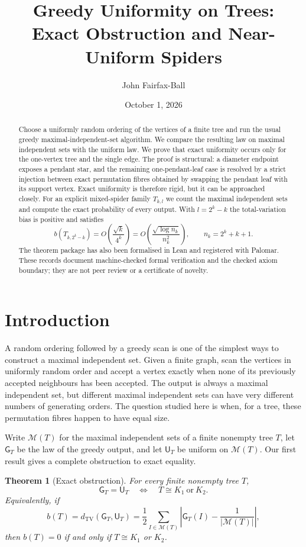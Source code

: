 \documentclass[11pt]{article}
\title{Greedy Uniformity on Trees:\\Exact Obstruction and Near-Uniform Spiders}
\author{John Fairfax-Ball}
\date{October 1, 2026}
\newtheorem{theorem}{Theorem}[section]
\theoremstyle{definition}
\newcommand{\M}{\mathcal{M}}
\newcommand{\GG}{\mathsf{G}}
\newcommand{\UU}{\mathsf{U}}
\newcommand{\TV}{\mathrm{TV}}
\begin{document}
\maketitle

\begin{abstract}
Choose a uniformly random ordering of the vertices of a finite tree and run the usual greedy maximal-independent-set algorithm.  We compare the resulting law on maximal independent sets with the uniform law.  We prove that exact uniformity occurs only for the one-vertex tree and the single edge.  The proof is structural: a diameter endpoint exposes a pendant star, and the remaining one-pendant-leaf case is resolved by a strict injection between exact permutation fibres obtained by swapping the pendant leaf with its support vertex.  Exact uniformity is therefore rigid, but it can be approached closely.  For an explicit mixed-spider family $T_{k,l}$ we count the maximal independent sets and compute the exact probability of every output.  With $l=2^k-k$ the total-variation bias is positive and satisfies
\[
 b(T_{k,2^k-k})=O\!\left(\frac{\sqrt{k}}{4^k}\right)
 =O\!\left(\frac{\sqrt{\log n_k}}{n_k^2}\right),
 \qquad n_k=2^k+k+1.
\]
The theorem package has also been formalised in Lean and registered with Palomar.  These records document machine-checked formal verification and the checked axiom boundary; they are not peer review or a certificate of novelty.
\end{abstract}

\section{Introduction}

A random ordering followed by a greedy scan is one of the simplest ways to construct a maximal independent set.  Given a finite graph, scan the vertices in uniformly random order and accept a vertex exactly when none of its previously accepted neighbours has been accepted.  The output is always a maximal independent set, but different maximal independent sets can have very different numbers of generating orders.  The question studied here is when, for a tree, these permutation fibres happen to have equal size.

Write $\M(T)$ for the maximal independent sets of a finite nonempty tree $T$, let $\GG_T$ be the law of the greedy output, and let $\UU_T$ be uniform on $\M(T)$.  Our first result gives a complete obstruction to exact equality.

\begin{theorem}[Exact obstruction]\label{thm:A}
For every finite nonempty tree $T$,
\[
 \GG_T=\UU_T
 \quad\Longleftrightarrow\quad
 T\cong K_1\ \text{or}\ K_2.
\]
Equivalently, if
\[
 b(T)=d_{\TV}(\GG_T,\UU_T)
 =\frac12\sum_{I\in\M(T)}
 \left|\GG_T(I)-\frac1{|\M(T)|}\right|,
\]
then $b(T)=0$ if and only if $T\cong K_1$ or $K_2$.
\end{theorem}
\end{document}
